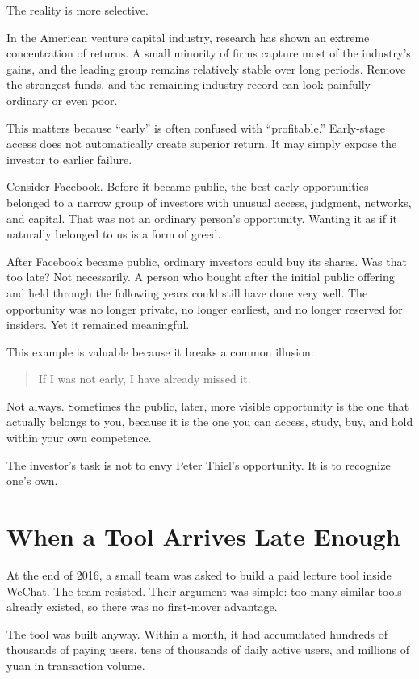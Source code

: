 The reality is more selective.

In the American venture capital industry, research has shown an extreme concentration of returns. A small minority of firms capture most of the industry's gains, and the leading group remains relatively stable over long periods. Remove the strongest funds, and the remaining industry record can look painfully ordinary or even poor.

This matters because ``early'' is often confused with ``profitable.'' Early-stage access does not automatically create superior return. It may simply expose the investor to earlier failure.

Consider Facebook. Before it became public, the best early opportunities belonged to a narrow group of investors with unusual access, judgment, networks, and capital. That was not an ordinary person's opportunity. Wanting it as if it naturally belonged to us is a form of greed.

After Facebook became public, ordinary investors could buy its shares. Was that too late? Not necessarily. A person who bought after the initial public offering and held through the following years could still have done very well. The opportunity was no longer private, no longer earliest, and no longer reserved for insiders. Yet it remained meaningful.

This example is valuable because it breaks a common illusion:

\begin{quote}
If I was not early, I have already missed it.
\end{quote}

Not always. Sometimes the public, later, more visible opportunity is the one that actually belongs to you, because it is the one you can access, study, buy, and hold within your own competence.

The investor's task is not to envy Peter Thiel's opportunity. It is to recognize one's own.

\section*{When a Tool Arrives Late Enough}

At the end of 2016, a small team was asked to build a paid lecture tool inside WeChat. The team resisted. Their argument was simple: too many similar tools already existed, so there was no first-mover advantage.

The tool was built anyway. Within a month, it had accumulated hundreds of thousands of paying users, tens of thousands of daily active users, and millions of yuan in transaction volume.


